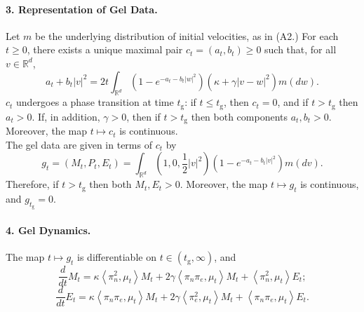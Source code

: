 \begin{theorem}
\paragraph{3. Representation of Gel Data.} Let $m$ be the underlying distribution of initial velocities, as in ({A2}.) For each $t\ge 0$, there exists a unique maximal pair $c_t=(a_t, b_t) \ge 0$ such that, for all $v\in \mathbb{R}^d$, \begin{equation}\label{eq: NLFP 1} a_t+b_t|v|^2=2t \int_{\mathbb{R}^d} (1-e^{-a_t-b_t|w|^2})(\kappa+\gamma|v-w|^2)m(dw). \end{equation} $c_t$ undergoes a phase transition at time $t_\mathrm{g}$: if $t\le t_\mathrm{g}$, then $c_t=0$, and if $t>t_\mathrm{g}$ then $a_t>0$. If, in addition, $\gamma>0$, then if $t>t_\mathrm{g}$ then both components $a_t, b_t>0$. Moreover, the map $t\mapsto c_t$ is continuous. \medskip \\  The gel data are given in terms of $c_t$ by \begin{equation}\label{eq: formula for M, E_0}
    g_t =(M_t, P_t, E_t)= \int_{\mathbb{R}^d} \left(1,0, \frac{1}{2}|v|^2\right)(1-e^{-a_t-b_t|v|^2})m(dv).
\end{equation} Therefore, if $t>t_\mathrm{g}$ then both $M_t, E_t>0$. Moreover, the map $t\mapsto g_t$ is continuous, and $g_{t_\mathrm{g}}=0$.
\paragraph{4. Gel Dynamics.} The map $t\mapsto g_t$ is differentiable on $t\in(t_\mathrm{g}, \infty)$, and
\begin{equation}
    \frac{d}{dt}M_t=\kappa\left<\pi_n^2,\mu_t\right>M_t +2\gamma 
        \left<\pi_n \pi_e,\mu_t \right>M_t +
        \left<\pi_n^2,\mu_t \right>E_t ;
\end{equation}
\begin{equation}
    \frac{d}{dt}E_t=
      \kappa \left<\pi_n \pi_e,\mu_t\right>M_t +
      2\gamma 
        \left<\pi_e^2,\mu_t \right>M_t +
        \left<\pi_n \pi_e,\mu_t \right>E_t.
\end{equation}

\end{theorem}
